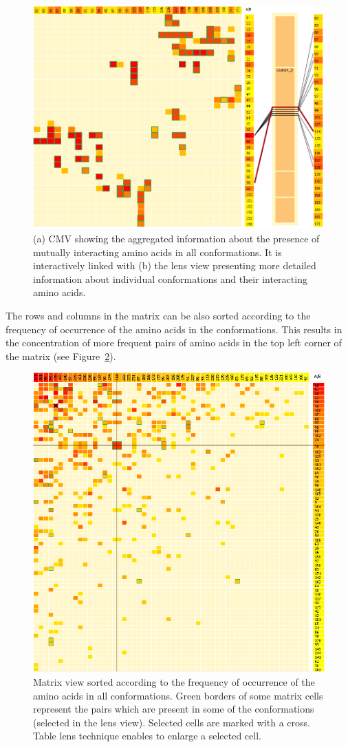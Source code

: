 \documentclass[journal]{vgtc}                %
\begin{document}
\begin{figure}[bt]
  \centering
  \includegraphics[width=1.0\columnwidth]{matrixlens.png}
  \caption{(a) CMV showing the aggregated information about the presence of mutually interacting amino acids in all conformations. It is interactively linked with (b) the lens view presenting more detailed information about individual conformations and their interacting amino acids.}
  \label{fig:matrixlens}
\end{figure}

The rows and columns in the matrix can be also sorted according to the frequency of occurrence of the amino acids in the conformations. 
This results in the concentration of more frequent pairs of amino acids in the top left corner of the matrix (see Figure~\ref{fig:sort}).

\begin{figure}[bt]
  \centering
  \includegraphics[width=0.8\columnwidth]{sort.png}
  \caption{Matrix view sorted according to the frequency of occurrence of the amino acids in all conformations. Green borders of some matrix cells represent the pairs which are present in some of the conformations (selected in the lens view). Selected cells are marked with a cross. Table lens technique enables to enlarge a selected cell.}
  \label{fig:sort}
\end{figure}
\end{document}
